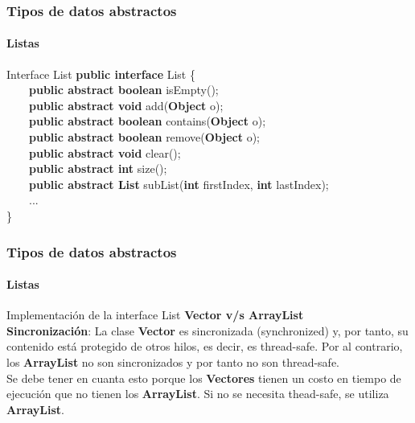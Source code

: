 \documentclass{beamer}
\begin{document}
		\begin{frame}
			\frametitle{Tipos de datos abstractos}
			\framesubtitle{Listas}

			\begin{block}{Interface List}
				\textbf{public interface} List \{ \\
				\ \ \ \ \textbf{public abstract boolean} isEmpty(); \\ 
				\ \ \ \ \textbf{public abstract void} add(\textbf{Object} o); \\
				\ \ \ \ \textbf{public abstract boolean} contains(\textbf{Object} o); \\ 
				\ \ \ \ \textbf{public abstract boolean} remove(\textbf{Object} o); \\
				\ \ \ \ \textbf{public abstract void} clear(); \\
				\ \ \ \ \textbf{public abstract int} size(); \\
				\ \ \ \ \textbf{public abstract List} subList(\textbf{int} firstIndex, \textbf{int} lastIndex); \\
				\ \ \ \ ... \\
				\}
			\end{block}
		\end{frame}	

		\begin{frame}
			\frametitle{Tipos de datos abstractos}
			\framesubtitle{Listas}

			\begin{block}{Implementaci\'on de la interface List}
				\textbf{Vector v/s ArrayList } \\
				\textbf{Sincronizaci\'on}: La clase \textbf{Vector} es sincronizada (synchronized) y, por tanto, su contenido est\'a protegido de otros hilos, es decir, es thread-safe. Por al contrario, los \textbf{ArrayList} no son sincronizados y por tanto no son thread-safe. \\
				Se debe tener en cuanta esto porque los \textbf{Vectores} tienen un costo en tiempo de ejecuci\'on que no tienen los \textbf{ArrayList}. Si no se necesita thead-safe, se utiliza \textbf{ArrayList}.
			\end{block}
		\end{frame}
\end{document}
